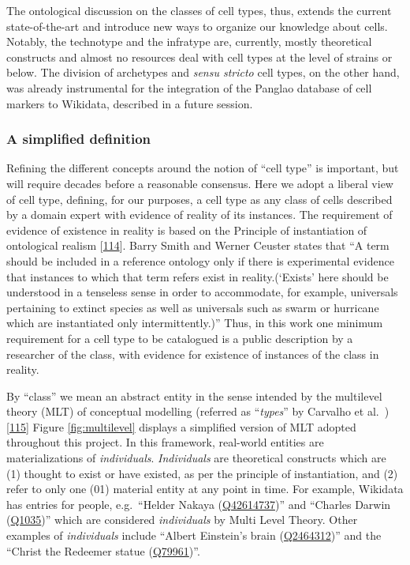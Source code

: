 The ontological discussion on the classes of cell types, thus, extends the current state-of-the-art and introduce new ways to organize our knowledge about cells.
Notably, the technotype and the infratype are, currently, mostly theoretical constructs and almost no resources deal with cell types at the level of strains or below.
The division of archetypes and \emph{sensu stricto} cell types, on the other hand, was already instrumental for the integration of the Panglao database of cell markers to Wikidata, described in a future session.

\hypertarget{a-simplified-definition}{%
\subsubsection{A simplified definition}\label{a-simplified-definition}}

Refining the different concepts around the notion of ``cell type'' is important, but will require decades before a reasonable consensus. Here we adopt a liberal view of cell type, defining, for our purposes, a cell type as any class of cells described by a domain expert with evidence of reality of its instances.
The requirement of evidence of existence in reality is based on the Principle of instantiation of ontological realism {[}\protect\hyperlink{ref-5ZFRyTy5}{114}{]}. Barry Smith and Werner Ceuster states that ``A term should be included in a reference ontology only if there is experimental evidence that instances to which that term refers exist in reality.(`Exists' here should be understood in a tenseless sense in order to accommodate, for example, universals pertaining to extinct species as well as universals such as swarm or hurricane which are instantiated only intermittently.)''
Thus, in this work one minimum requirement for a cell type to be catalogued is a public description by a researcher of the class, with evidence for existence of instances of the class in reality.

By ``class'' we mean an abstract entity in the sense intended by the multilevel theory (MLT) of conceptual modelling (referred as ``\emph{types}'' by Carvalho et al.~) {[}\protect\hyperlink{ref-eP47FILn}{115}{]}
Figure \ref{fig:multilevel} displays a simplified version of MLT adopted throughout this project.
In this framework, real-world entities are materializations of \emph{individuals}.
\emph{Individuals} are theoretical constructs which are (1) thought to exist or have existed, as per the principle of instantiation, and (2) refer to only one (01) material entity at any point in time.
For example, Wikidata has entries for people, e.g.~``Helder Nakaya (\href{https://www.wikidata.org/wiki/Q42614737}{Q42614737})'' and ``Charles Darwin (\href{https://www.wikidata.org/wiki/Q42614737}{Q1035})'' which are considered \emph{individuals} by Multi Level Theory.
Other examples of \emph{individuals} include ``Albert Einstein's brain (\href{https://www.wikidata.org/wiki/Q2464312}{Q2464312})'' and the ``Christ the Redeemer statue (\href{https://www.wikidata.org/wiki/Q79961}{Q79961})''.

